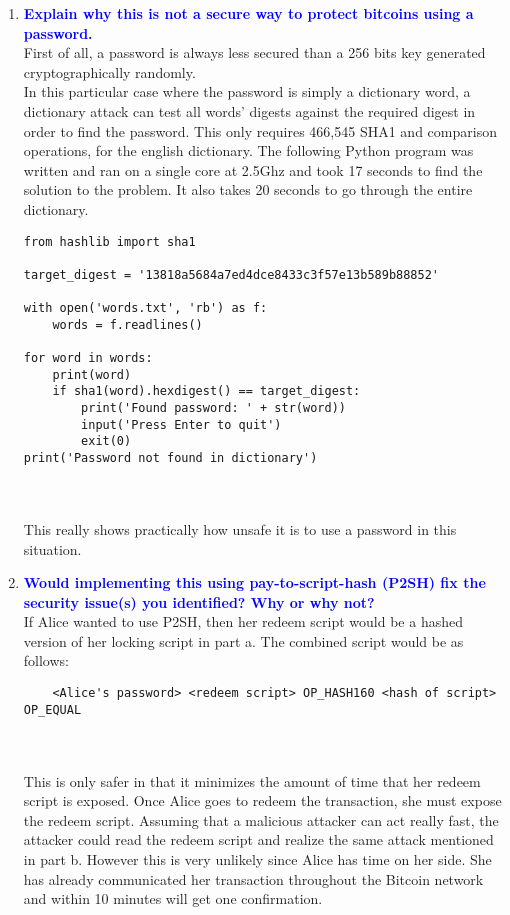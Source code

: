 \documentclass[11pt]{article}
\begin{document}
\begin{enumerate}
\begin{enumerate}
    \item \textbf{\textcolor{blue}{Explain why this is not a secure way to protect bitcoins using a password.}}
        \\ First of all, a password is always less secured than a 256 bits key generated cryptographically randomly. 
        \\ In this particular case where the password is simply a dictionary word, a dictionary attack can test all words' digests against the required digest in order to find the password. This only requires 466,545 SHA1 and comparison operations, for the english dictionary. The following Python program was written and ran on a single core at 2.5Ghz and took 17 seconds to find the solution to the problem. It also takes 20 seconds to go through the entire dictionary.
        
\begin{verbatim}
from hashlib import sha1

target_digest = '13818a5684a7ed4dce8433c3f57e13b589b88852'

with open('words.txt', 'rb') as f:
	words = f.readlines()

for word in words:
	print(word)
	if sha1(word).hexdigest() == target_digest:
		print('Found password: ' + str(word))
		input('Press Enter to quit')
		exit(0)
print('Password not found in dictionary')
\end{verbatim}
    
    \\\\ This really shows practically how unsafe it is to use a password in this situation.

    \item \textbf{\textcolor{blue}{Would implementing this using pay-to-script-hash (P2SH) fix the security issue(s) you identified? Why or why not?}}
    \\ If Alice wanted to use P2SH, then her redeem script would be a hashed version of her locking script in part a. The combined script would be as follows:
    
    \begin{verbatim}
    <Alice's password> <redeem script> OP_HASH160 <hash of script> OP_EQUAL
    \end{verbatim}
    
    \\\\ This is only safer in that it minimizes the amount of time that her redeem script is exposed. Once Alice goes to redeem the transaction, she must expose the redeem script. Assuming that a malicious attacker can act really fast, the attacker could read the redeem script and realize the same attack mentioned in part b. However this is very unlikely since Alice has time on her side. She has already communicated her transaction throughout the Bitcoin network and within 10 minutes will get one confirmation.
    \end{enumerate}
    

\end{enumerate}
\end{document}
